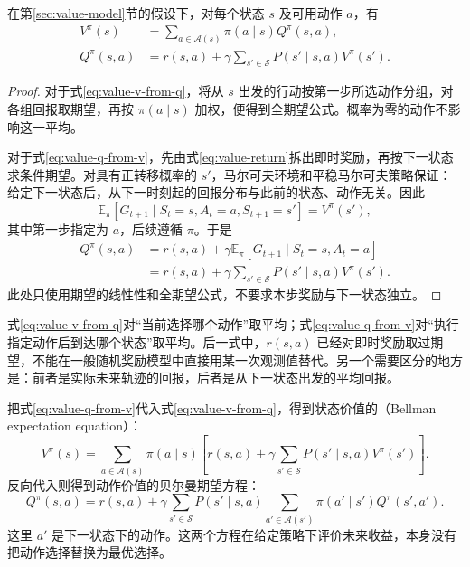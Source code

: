 \documentclass[UTF8]{ctexart}
\begin{document}
\begin{proposition}[按动作平均与按下一状态平均]
\label{prop:value-relations}
在第\ref{sec:value-model}节的假设下，对每个状态 $s$ 及可用动作 $a$，有
\begin{align}
  V^\pi(s)
    &=\sum_{a\in\mathcal A(s)}\pi(a\mid s)Q^\pi(s,a),
    \label{eq:value-v-from-q}\\
  Q^\pi(s,a)
    &=r(s,a)+\gamma\sum_{s'\in\mathcal S}P(s'\mid s,a)V^\pi(s').
    \label{eq:value-q-from-v}
\end{align}
\end{proposition}

\begin{proof}
对于式\eqref{eq:value-v-from-q}，将从 $s$ 出发的行动按第一步所选动作分组，对各组回报取期望，再按 $\pi(a\mid s)$ 加权，便得到全期望公式。概率为零的动作不影响这一平均。

对于式\eqref{eq:value-q-from-v}，先由式\eqref{eq:value-return}拆出即时奖励，再按下一状态求条件期望。对具有正转移概率的 $s'$，马尔可夫环境和平稳马尔可夫策略保证：给定下一状态后，从下一时刻起的回报分布与此前的状态、动作无关。因此
\[
  \mathbb E_\pi[G_{t+1}\mid S_t=s,A_t=a,S_{t+1}=s']
  =V^\pi(s'),
\]
其中第一步指定为 $a$，后续遵循 $\pi$。于是
\[
  \begin{aligned}
    Q^\pi(s,a)
      &=r(s,a)+\gamma\mathbb E_\pi[G_{t+1}\mid S_t=s,A_t=a]\\
      &=r(s,a)+\gamma\sum_{s'\in\mathcal S}P(s'\mid s,a)V^\pi(s').
  \end{aligned}
\]
此处只使用期望的线性性和全期望公式，不要求本步奖励与下一状态独立。
\end{proof}

式\eqref{eq:value-v-from-q}对“当前选择哪个动作”取平均；式\eqref{eq:value-q-from-v}对“执行指定动作后到达哪个状态”取平均。后一式中，$r(s,a)$ 已经对即时奖励取过期望，不能在一般随机奖励模型中直接用某一次观测值替代。另一个需要区分的地方是：前者是实际未来轨迹的回报，后者是从下一状态出发的平均回报。

把式\eqref{eq:value-q-from-v}代入式\eqref{eq:value-v-from-q}，得到状态价值的（Bellman expectation equation）：
\begin{equation}
  V^\pi(s)=\sum_{a\in\mathcal A(s)}\pi(a\mid s)
  \left[r(s,a)+\gamma\sum_{s'\in\mathcal S}P(s'\mid s,a)V^\pi(s')\right].
  \label{eq:value-bellman-v}
\end{equation}
反向代入则得到动作价值的贝尔曼期望方程：
\begin{equation}
  Q^\pi(s,a)=r(s,a)+\gamma\sum_{s'\in\mathcal S}P(s'\mid s,a)
  \sum_{a'\in\mathcal A(s')}\pi(a'\mid s')Q^\pi(s',a').
  \label{eq:value-bellman-q}
\end{equation}
这里 $a'$ 是下一状态下的动作。这两个方程在给定策略下评价未来收益，本身没有把动作选择替换为最优选择。
\end{document}

